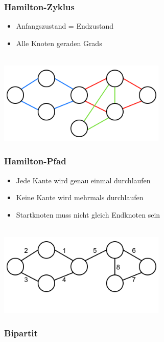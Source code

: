 \begin{minipage}{0.5\textwidth}
\subsubsection*{Hamilton-Zyklus}
\begin{itemize}[leftmargin=*]
\item Anfangszustand = Endzustand
\item Alle Knoten geraden Grads
\end{itemize}\
\\
\includegraphics[width=0.6\textwidth]{graphics/graph_euler_zyklus.png}
\end{minipage}
\hfill
\begin{minipage}{0.5\textwidth}
\subsubsection*{Hamilton-Pfad}
\begin{itemize}[leftmargin=*]
\item Jede Kante wird genau einmal durchlaufen
\item Keine Kante wird mehrmals durchlaufen
\item Startknoten muss nicht gleich Endknoten sein
\end{itemize}\
\\
\includegraphics[width=0.6\textwidth]{graphics/graph_euler_pfad.png}\end{minipage}

\subsubsection*{Bipartit}

